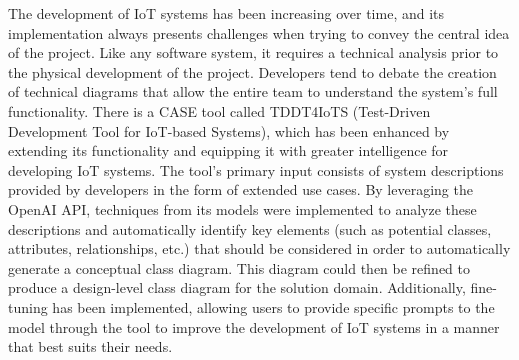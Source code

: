 
The development of IoT systems has been increasing over time, and its implementation always presents challenges when trying to convey the central idea of the project. Like any software system, it requires a technical analysis prior to the physical development of the project. Developers tend to debate the creation of technical diagrams that allow the entire team to understand the system's full functionality. There is a CASE tool called TDDT4IoTS (Test-Driven Development Tool for IoT-based Systems), which has been enhanced by extending its functionality and equipping it with greater intelligence for developing IoT systems. The tool's primary input consists of system descriptions provided by developers in the form of extended use cases. By leveraging the OpenAI API, techniques from its models were implemented to analyze these descriptions and automatically identify key elements (such as potential classes, attributes, relationships, etc.) that should be considered in order to automatically generate a conceptual class diagram. This diagram could then be refined to produce a design-level class diagram for the solution domain. Additionally, fine-tuning has been implemented, allowing users to provide specific prompts to the model through the tool to improve the development of IoT systems in a manner that best suits their needs.
